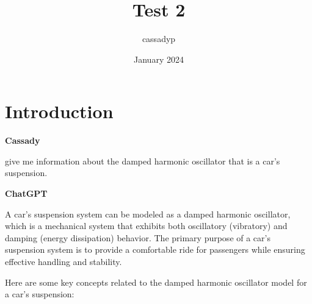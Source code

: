 \documentclass{article}
\title{Test 2}
\author{cassadyp }
\date{January 2024}
\begin{document}
\maketitle

\section{Introduction}

\begin{center}
    \textbf{Cassady}
\end{center}

give me information about the damped harmonic oscillator that is a 
car's suspension.

\begin{center}
    \textbf{ChatGPT}
\end{center}

A car's suspension system can be modeled as a damped harmonic oscillator, which is a mechanical system that exhibits both oscillatory (vibratory) and damping (energy dissipation) behavior. The primary purpose of a car's suspension system is to provide a comfortable ride for passengers while ensuring effective handling and stability.
\newline

Here are some key concepts related to the damped harmonic oscillator model for a car's suspension:
\end{document}
